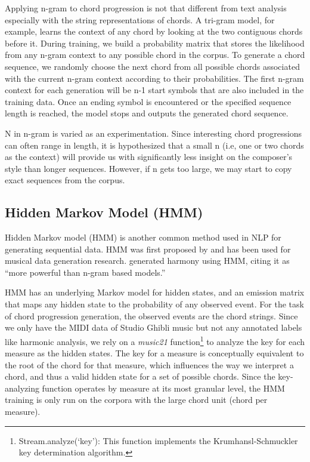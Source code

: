 \documentclass[11pt,a4paper]{article}
\begin{document}
Applying n-gram to chord progression is not that different from text analysis especially with the string representations of chords. A tri-gram model, for example, learns the context of any chord by looking at the two contiguous chords before it. During training, we build a probability matrix that stores the likelihood from any n-gram context to any possible chord in the corpus. To generate a chord sequence, we randomly choose the next chord from all possible chords associated with the current n-gram context according to their probabilities. The first n-gram context for each generation will be n-1 start symbols that are also included in the training data. Once an ending symbol is encountered or the specified sequence length is reached, the model stops and outputs the generated chord sequence.

N in n-gram is varied as an experimentation. Since interesting chord progressions can often range in length, it is hypothesized that a small n (i.e, one or two chords as the context) will provide us with significantly less insight on the composer’s style than longer sequences. However, if n gets too large, we may start to copy exact sequences from the corpus. 


\subsection{Hidden Markov Model (HMM)}
Hidden Markov model (HMM) is another common method used in NLP for generating sequential data. HMM was first proposed by \citet{baum1966} and has been used for musical data generation research. \citet{ponsford1999} generated harmony using HMM, citing it as “more powerful than n-gram based models.” 

HMM has an underlying Markov model for hidden states, and an emission matrix that maps any hidden state to the probability of any observed event. For the task of chord progression generation, the observed events are the chord strings. Since we only have the MIDI data of Studio Ghibli music but not any annotated labels like harmonic analysis, we rely on a \emph{music21} function\footnote{Stream.analyze(‘key’): This function implements the Krumhansl-Schmuckler key determination algorithm.} to analyze the key for each measure as the hidden states. The key for a measure is conceptually equivalent to the root of the chord for that measure, which influences the way we interpret a chord, and thus a valid hidden state for a set of possible chords. Since the key-analyzing function operates by measure at its most granular level, the HMM training is only run on the corpora with the large chord unit (chord per measure). 
\end{document}
